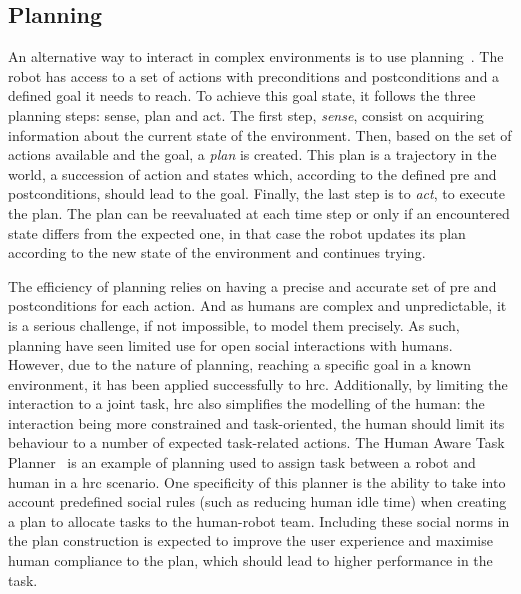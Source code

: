 \subsection{Planning} \label{ssec:planning}
    
    An alternative way to interact in complex environments is to use planning~\citep{asada1986robot}. The robot has access to a set of actions with preconditions and postconditions and a defined goal it needs to reach. To achieve this goal state, it follows the three planning steps: sense, plan and act. The first step, \emph{sense}, consist on acquiring information about the current state of the environment. Then, based on the set of actions available and the goal, a \emph{plan} is created. This plan is a trajectory in the world, a succession of action and states which, according to the defined pre and postconditions, should lead to the goal. Finally, the last step is to \emph{act}, to execute the plan. The plan can be reevaluated at each time step or only if an encountered state differs from the expected one, in that case the robot updates its plan according to the new state of the environment and continues trying.
    
    
    The efficiency of planning relies on having a precise and accurate set of pre and postconditions for each action. And as humans are complex and unpredictable, it is a serious challenge, if not impossible, to model them precisely. As such, planning have seen limited use for open social interactions with humans. However, due to the nature of planning, reaching a specific goal in a known environment, it has been applied successfully to \acrfull{hrc}. Additionally, by limiting the interaction to a joint task, \gls{hrc} also simplifies the modelling of the human: the interaction being more constrained and task-oriented, the human should limit its behaviour to a number of expected task-related actions. The Human Aware Task Planner~\citep{alili2009task} is an example of planning used to assign task between a robot and human in a \gls{hrc} scenario. One specificity of this planner is the ability to take into account predefined social rules (such as reducing human idle time) when creating a plan to allocate tasks to the human-robot team. Including these social norms in the plan construction is expected to improve the user experience and  maximise human compliance to the plan, which should lead to higher performance in the task.
    
